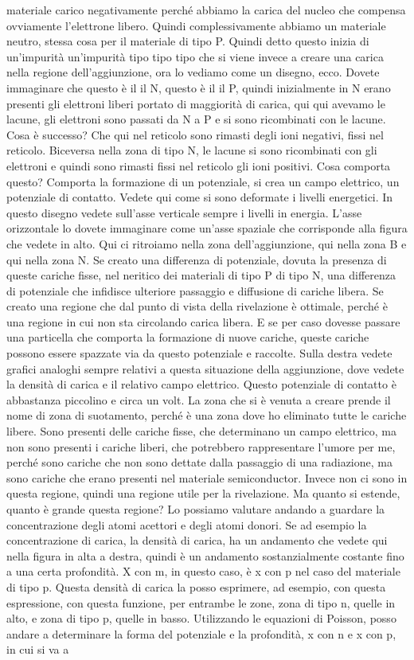 materiale carico negativamente perché abbiamo la carica del nucleo che compensa ovviamente l'elettrone libero. Quindi complessivamente abbiamo un materiale neutro, stessa cosa per il materiale di tipo P. Quindi detto questo inizia di un'impurità un'impurità tipo tipo tipo che si viene invece a creare una carica nella regione dell'aggiunzione, ora lo vediamo come un disegno, ecco. Dovete immaginare che questo è il il N, questo è il il P, quindi inizialmente in N erano presenti gli elettroni liberi portato di maggiorità di carica, qui qui avevamo le lacune, gli elettroni sono passati da N a P e si sono ricombinati con le lacune. Cosa è successo? Che qui nel reticolo sono rimasti degli ioni negativi, fissi nel reticolo. Biceversa nella zona di tipo N, le lacune si sono ricombinati con gli elettroni e quindi sono rimasti fissi nel reticolo gli ioni positivi. Cosa comporta questo? Comporta la formazione di un potenziale, si crea un campo elettrico, un potenziale di contatto. Vedete qui come si sono deformate i livelli energetici. In questo disegno vedete sull'asse verticale sempre i livelli in energia. L'asse orizzontale lo dovete immaginare come un'asse spaziale che corrisponde alla figura che vedete in alto. Qui ci ritroiamo nella zona dell'aggiunzione, qui nella zona B e qui nella zona N. Se creato una differenza di potenziale, dovuta la presenza di queste cariche fisse, nel neritico dei materiali di tipo P di tipo N, una differenza di potenziale che infidisce ulteriore passaggio e diffusione di cariche libera. Se creato una regione che dal punto di vista della rivelazione è ottimale, perché è una regione in cui non sta circolando carica libera. E se per caso dovesse passare una particella che comporta la formazione di nuove cariche, queste cariche possono essere spazzate via da questo potenziale e raccolte. Sulla destra vedete grafici analoghi sempre relativi a questa situazione della aggiunzione, dove vedete la densità di carica e il relativo campo elettrico. Questo potenziale di contatto è abbastanza piccolino e circa un volt. La zona che si è venuta a creare prende il nome di zona di suotamento, perché è una zona dove ho eliminato tutte le cariche libere. Sono presenti delle cariche fisse, che determinano un campo elettrico, ma non sono presenti i cariche liberi, che potrebbero rappresentare l'umore per me, perché sono cariche che non sono dettate dalla passaggio di una radiazione, ma sono cariche che erano presenti nel materiale semiconductor. Invece non ci sono in questa regione, quindi una regione utile per la rivelazione. Ma quanto si estende, quanto è grande questa regione? Lo possiamo valutare andando a guardare la concentrazione degli atomi acettori e degli atomi donori. Se ad esempio la concentrazione di carica, la densità di carica, ha un andamento che vedete qui nella figura in alta a destra, quindi è un andamento sostanzialmente costante fino a una certa profondità. X con m, in questo caso, è x con p nel caso del materiale di tipo p. Questa densità di carica la posso esprimere, ad esempio, con questa espressione, con questa funzione, per entrambe le zone, zona di tipo n, quelle in alto, e zona di tipo p, quelle in basso. Utilizzando le equazioni di Poisson, posso andare a determinare la forma del potenziale e la profondità, x con n e x con p, in cui si va a 
